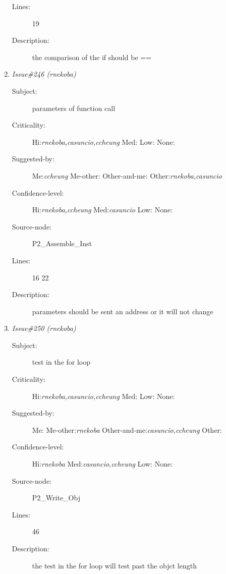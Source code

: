 \begin{enumerate}
\begin{description}
\item [Lines:] 19

\item [Description:] the comparison of the if should be ==
\end{description}
\item {\it Issue\#246 (rnekoba)}
\begin{description}
\item [Subject:] parameters of function call
\item [Criticality:] Hi:{\it rnekoba,casuncio,ccheung} Med:{\it } Low:{\it } None:{\it }
\item [Suggested-by:] Me:{\it ccheung} Me-other:{\it } Other-and-me:{\it } Other:{\it rnekoba,casuncio}
\item [Confidence-level:] Hi:{\it rnekoba,ccheung} Med:{\it casuncio} Low:{\it } None:{\it }
\item [Source-node:] P2\_Assemble\_Inst

\item [Lines:] 16 22

\item [Description:] parameters should be sent an address or it
will not change
\end{description}
\item {\it Issue\#250 (rnekoba)}
\begin{description}
\item [Subject:] test in the for loop
\item [Criticality:] Hi:{\it rnekoba,casuncio,ccheung} Med:{\it } Low:{\it } None:{\it }
\item [Suggested-by:] Me:{\it } Me-other:{\it rnekoba} Other-and-me:{\it casuncio,ccheung} Other:{\it }
\item [Confidence-level:] Hi:{\it rnekoba} Med:{\it casuncio,ccheung} Low:{\it } None:{\it }
\item [Source-node:] P2\_Write\_Obj

\item [Lines:] 46

\item [Description:] the test in the for loop will test past the
objct length
\end{description}
\end{enumerate}
